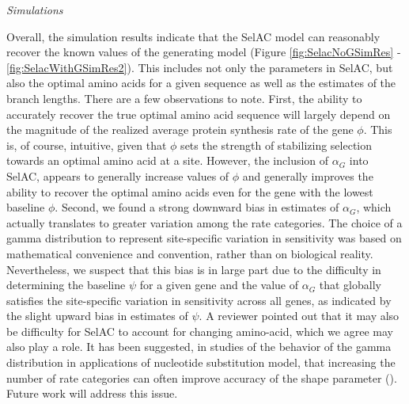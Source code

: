 \documentclass[12pt,letterpaper,fleqn]{article}
\renewcommand{\subsection}[1]{%
\bigskip
\begin{center}
\begin{large}
\normalfont\itshape #1
\end{large}
\end{center}}
\newcommand{\selac}{SelAC\xspace}
\newcommand{\alphag}{\ensuremath{\alpha_G}\xspace}
\begin{document}
\subsection{Simulations}
Overall, the simulation results indicate that the SelAC model can reasonably recover the known values of the generating model (Figure \ref{fig:SelacNoGSimRes} - \ref{fig:SelacWithGSimRes2}).
This includes not only the parameters in \selac, but also the optimal amino acids for a given sequence as well as the estimates of the branch lengths.
There are a few observations to note.
First, the ability to accurately recover the true optimal amino acid sequence will largely depend on the magnitude of the realized average protein synthesis rate of the gene $\phi$.
This is, of course, intuitive, given that $\phi$ sets the strength of stabilizing selection towards an optimal amino acid at a site.
However, the inclusion of $\alphag$ into \selac, appears to generally increase values of $\phi$ and generally improves the ability to recover the optimal amino acids even for the gene with the lowest baseline $\phi$.
Second, we found a strong downward bias in estimates of $\alphag$, which actually translates to greater variation among the rate categories.
The choice of a gamma distribution to represent site-specific variation in sensitivity was based on mathematical convenience and convention, rather than on biological reality.
Nevertheless, we suspect that this bias is in large part due to the difficulty in determining the baseline $\psi$ for a given gene and the value of $\alphag$ that globally satisfies the site-specific variation in sensitivity across all genes, as indicated by the slight upward bias in estimates of $\psi$.
A reviewer pointed out that it may also be difficulty for \selac to account for changing amino-acid, which we agree may also play a role.
It has been suggested, in studies of the behavior of the gamma distribution in applications of nucleotide substitution model, that increasing the number of rate categories can often improve accuracy of the shape parameter (\citet{MayroseEtAl2005}).
Future work will address this issue.
\end{document}
